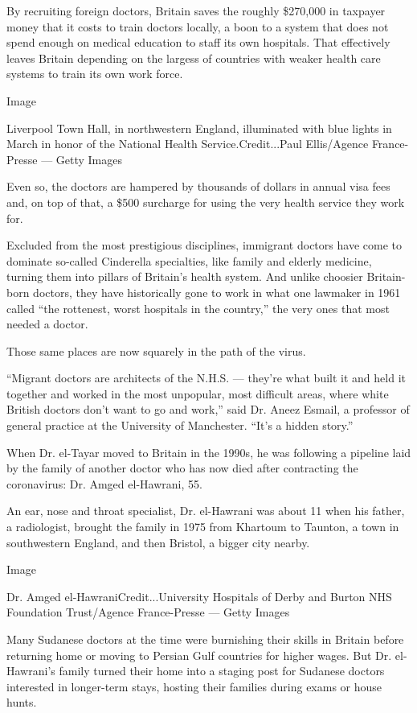 By recruiting foreign doctors, Britain saves the roughly \$270,000 in
taxpayer money that it costs to train doctors locally, a boon to a
system that does not spend enough on medical education to staff its own
hospitals. That effectively leaves Britain depending on the largess of
countries with weaker health care systems to train its own work force.

Image

Liverpool Town Hall, in northwestern England, illuminated with blue
lights in March in honor of the National Health Service.Credit...Paul
Ellis/Agence France-Presse --- Getty Images

Even so, the doctors are hampered by thousands of dollars in annual visa
fees and, on top of that, a \$500 surcharge for using the very health
service they work for.

Excluded from the most prestigious disciplines, immigrant doctors have
come to dominate so-called Cinderella specialties, like family and
elderly medicine, turning them into pillars of Britain's health system.
And unlike choosier Britain-born doctors, they have historically gone to
work in what one lawmaker in 1961 called ``the rottenest, worst
hospitals in the country,'' the very ones that most needed a doctor.

Those same places are now squarely in the path of the virus.

``Migrant doctors are architects of the N.H.S. --- they're what built it
and held it together and worked in the most unpopular, most difficult
areas, where white British doctors don't want to go and work,'' said Dr.
Aneez Esmail, a professor of general practice at the University of
Manchester. ``It's a hidden story.''

When Dr. el-Tayar moved to Britain in the 1990s, he was following a
pipeline laid by the family of another doctor who has now died after
contracting the coronavirus: Dr. Amged el-Hawrani, 55.

An ear, nose and throat specialist, Dr. el-Hawrani was about 11 when his
father, a radiologist, brought the family in 1975 from Khartoum to
Taunton, a town in southwestern England, and then Bristol, a bigger city
nearby.

Image

Dr. Amged el-HawraniCredit...University Hospitals of Derby and Burton
NHS Foundation Trust/Agence France-Presse --- Getty Images

Many Sudanese doctors at the time were burnishing their skills in
Britain before returning home or moving to Persian Gulf countries for
higher wages. But Dr. el-Hawrani's family turned their home into a
staging post for Sudanese doctors interested in longer-term stays,
hosting their families during exams or house hunts.


